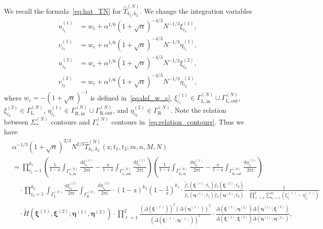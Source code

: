 \documentclass{article}
\numberwithin{equation}{section}
\newcommand{\ddbar}[2]{\frac{{\mathrm d}#1}{2\pi {\mathrm i}#2}}
\newcommand{\inn}{\mathrm{in}}
\newcommand{\LL}{\mathrm{L}}
\newcommand{\out}{\mathrm{out}}
\newcommand{\RR}{\mathrm{R}}
\begin{document}
We recall the formula~\eqref{eq:hat_TN} for $\hat T_{k_1,k_2}^{(N)}$. We change the integration variables
\begin{equation}
	\label{eq:change_variables}
	\begin{split}
	u_{i_1}^{(1)} &= w_c + \alpha^{1/6} (1+\sqrt{\alpha})^{-4/3}N^{-1/3} \xi_{i_1}^{(1)},\\
	v_{i_1}^{(1)} &= w_c + \alpha^{1/6} (1+\sqrt{\alpha})^{-4/3}N^{-1/3} \eta_{i_1}^{(1)},\\
	u_{i_2}^{(2)} &= w_c + \alpha^{1/6} (1+\sqrt{\alpha})^{-4/3}N^{-1/3} \xi_{i_2}^{(2)},\\
	v_{i_2}^{(2)} &= w_c + \alpha^{1/6} (1+\sqrt{\alpha})^{-4/3}N^{-1/3} \eta_{i_2}^{(2)},
	\end{split}
\end{equation}
where $w_c=-(1+\sqrt{\alpha})^{-1}$ is defined in~\eqref{eq:def_w_c},  $\xi_{i_1}^{(1)} \in \Gamma_{\LL,\inn}^{(N)} \cup \Gamma_{\LL,\out}^{(N)}$, $\xi_{i_2}^{(2)} \in \Gamma_\LL^{(N)}$, $\eta_{i_1}^{(1)} \in \Gamma_{\RR,\inn}^{(N)} \cup \Gamma_{\RR,\out}^{(N)}$, and $\eta_{i_2}^{(2)} \in \Gamma_\RR^{(N)}$. Note the relation between  $\Sigma_*^{(N)}$ contours and $\Gamma_*^{(N)}$ contours in~\eqref{eq:relation_contours}. Thus we have
\begin{equation}
	\label{eq:aux_16}
	\begin{split}
		&\alpha^{-1/3}(1+\sqrt{\alpha})^{2/3}N^{2/3}\hat T_{k_1,k_2}^{(N)}(\mathrm{z};t_1,t_2;m,n,M,N)\\
		&=
		\prod_{i_1=1}^{k_1}     
		\left(  \frac{1}{1-\mathrm{z}} \int_{\Gamma^{(N)}_{\LL,\inn}} 	    
		\ddbar{\xi^{(1)}_{i_1}}{}   
		-\frac{\mathrm{z}}{1-\mathrm{z}} \int_{\Gamma^{(N)}_{\LL,\out}} \ddbar{\xi^{(1)}_{i_1}}{}
		\right)
		\left(  \frac{1}{1-\mathrm{z}}  \int_{\Gamma^{(N)}_{\RR,\inn}}  
		\ddbar{\eta^{(1)}_{i_1}}{}
		-\frac{\mathrm{z}}{1-\mathrm{z}}   \int_{\Gamma^{(N)}_{\RR,\out}}
		\ddbar{\eta^{(1)}_{i_1}}{}
		\right)
		\\
		&\quad \cdot 
		\prod_{i_2=1}^{k_2}  
		\int_{\Gamma^{(N)}_\LL} \ddbar{\xi^{(2)}_{i_2}}{} 
		\int_{\Gamma^{(N)}_\RR} \ddbar{\eta^{(2)}_{i_2}}{} 
		\cdot    
		\left(1-\mathrm{z}\right)^{k_2}
		\left(1-\frac{1}{\mathrm{z}}\right)^{k_1}
		\cdot 
		\frac
		{\tilde f_1(\boldsymbol{\xi}^{(1)};t_1)
			\tilde f_2(\boldsymbol{\xi}^{(2)};t_2)}
		{\tilde f_1(\boldsymbol{\eta}^{(1)};t_1)
			\tilde f_2(\boldsymbol{\eta}^{(2)};t_2)}
		\cdot
		\frac{1}{\prod_{\ell=1}^2\sum_{i_\ell=1}^{k_\ell}(\xi_{i_\ell}^{(\ell)} -\eta_{i_\ell}^{(\ell)})}
		\\
		&\quad \cdot
		\tilde {H}(\boldsymbol{\xi}^{(1)},\boldsymbol{\xi}^{(2)};
		\boldsymbol{\eta}^{(1)},\boldsymbol{\eta}^{(2)}) \cdot 
		\prod_{\ell=1}^2
		\frac{\left( \Delta(\boldsymbol{\xi}^{(\ell)}) \right)^2
			\left( \Delta(\boldsymbol{\eta}^{(\ell)}) \right)^2
		}
		{\left( \Delta(\boldsymbol{\xi}^{(\ell)}; \boldsymbol{\eta}^{(\ell)}) \right)^2}
		\cdot 
		\frac{\Delta(\boldsymbol{\xi}^{(1)};\boldsymbol{\eta}^{(2)})
			\Delta(\boldsymbol{\eta}^{(1)};\boldsymbol{\xi}^{(2)})
		}
		{\Delta(\boldsymbol{\xi}^{(1)};\boldsymbol{\xi}^{(2)})
			\Delta(\boldsymbol{\eta}^{(1)};\boldsymbol{\eta}^{(2)})
		},
	\end{split}
\end{equation}
\end{document}
